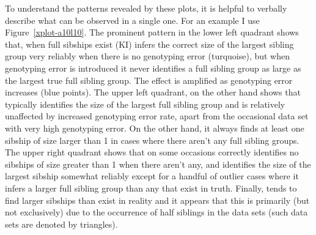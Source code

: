 \documentclass[11pt,landscape]{report}
\begin{document}
To understand the patterns revealed by these plots, it is helpful to verbally describe what can be observed in a single one.  For an example I use Figure~\ref{xplot-a10l10}.  The prominent pattern in the lower left quadrant shows that, when full sibships exist \kinalyzer{} (KI) infers the correct size of the largest sibling group very reliably when there is no genotyping error (turquoise), but when genotyping error is introduced it never identifies a full sibling group as large as the largest true full sibling group.  The effect is amplified as genotyping error increases (blue points).  The upper left quadrant, on the other hand shows that \colony{} typically identifies the size of the largest full sibling group and is relatively unaffected by increased genotyping error rate, apart from the occasional data set with very high genotyping error.  On the other hand, it always finds at least one sibship of size larger than 1 in cases where there aren't any full sibling groups.  The upper right quadrant shows that on some occasions \prt{} correctly identifies no sibships of size greater than 1 when there aren't any, and identifies the size of the largest sibship somewhat reliably except for a handful of outlier cases where it infers a larger full sibling group than any that exist in truth.  Finally, \familyfinder{} tends to find larger sibships than exist in reality and it appears that this is primarily (but not exclusively) due to the occurrence of half siblings in the data sets (such data sets are denoted by triangles).  


\listoffigures


\end{document}
